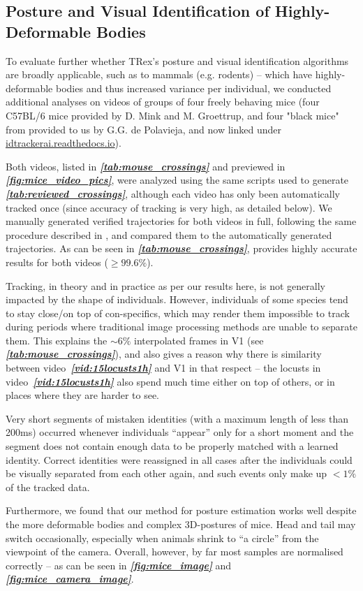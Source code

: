 \documentclass[9pt,lineno]{elife}
\newcommand{\figref}[1]{\textit{\textbf{\ref{#1}}}}
\newcommand{\tableref}[1]{\textit{\textbf{\ref{tab:#1}}}\xspace}
\newcommand{\videoref}[1]{video~\textit{\textbf{\ref{#1}}}}
\newcommand{\TRex}{\protect\path{TRex}}
\newcommand{\changemade}[1]{#1}
\begin{document}
\begin{appendixbox}
\changemade{
\section{Posture and Visual Identification of Highly-Deformable Bodies} \label{sec:deformable_bodies}

To evaluate further whether TRex's posture and visual identification algorithms are broadly applicable, such as to mammals (e.g. rodents) -- which have highly-deformable bodies and thus increased variance per individual, we conducted additional analyses on videos of groups of four freely behaving mice (four C57BL/6 mice provided by D. Mink and M. Groettrup, and four "black mice" from \cite{idtrackerai} provided to us by G.G. de Polavieja, and now linked under \href{https://idtrackerai.readthedocs.io/en/latest/data.html}{idtrackerai.readthedocs.io}).

Both videos, listed in \tableref{mouse_crossings} and previewed in \figref{fig:mice_video_pics}, were analyzed using the same scripts used to generate \tableref{reviewed_crossings}, although each video has only been automatically tracked once (since accuracy of tracking is very high, as detailed below). We manually generated verified trajectories for both videos in full, following the same procedure described in \nameref{sec:human_validation}, and compared them to the automatically generated trajectories. As can be seen in \tableref{mouse_crossings}, \TRex{} provides highly accurate results for both videos ($\geq 99.6\%$).

Tracking, in theory and in practice as per our results here, is not generally impacted by the shape of individuals. However, individuals of some species tend to stay close/on top of con-specifics, which may render them impossible to track during periods where traditional image processing methods are unable to separate them. This explains the $\sim6\%$ interpolated frames in V1 (see \tableref{mouse_crossings}), and also gives a reason why there is similarity between \videoref{vid:15locusts1h} and V1 in that respect -- the locusts in \videoref{vid:15locusts1h} also spend much time either on top of others, or in places where they are harder to see.

Very short segments of mistaken identities (with a maximum length of less than 200ms) occurred whenever individuals “appear” only for a short moment and the segment does not contain enough data to be properly matched with a learned identity. Correct identities were reassigned in all cases after the individuals could be visually separated from each other again, and such events only make up $<1\%$ of the tracked data.

Furthermore, we found that our method for posture estimation works well despite the more deformable bodies and complex 3D-postures of mice. Head and tail may switch occasionally, especially when animals shrink to “a circle” from the viewpoint of the camera. Overall, however, by far most samples are normalised correctly -- as can be seen in \figref{fig:mice_image} and \figref{fig:mice_camera_image}.}

\end{appendixbox}
\end{document}

